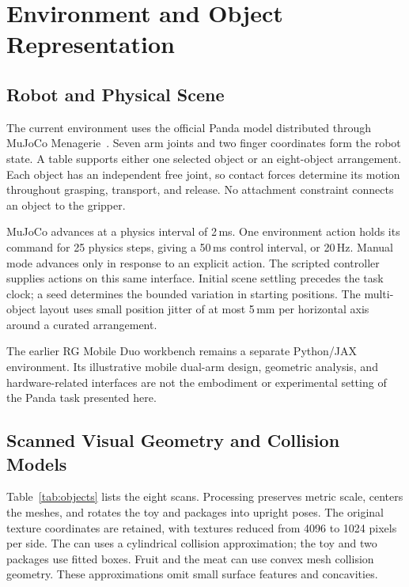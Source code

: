 \documentclass[10pt]{article}
\begin{document}
\section{Environment and Object Representation}
\subsection{Robot and Physical Scene}
The current environment uses the official Panda model distributed through MuJoCo Menagerie~\cite{menagerie}. Seven arm joints and two finger coordinates form the robot state. A table supports either one selected object or an eight-object arrangement. Each object has an independent free joint, so contact forces determine its motion throughout grasping, transport, and release. No attachment constraint connects an object to the gripper.

MuJoCo advances at a physics interval of 2\,ms. One environment action holds its command for 25 physics steps, giving a 50\,ms control interval, or 20\,Hz. Manual mode advances only in response to an explicit action. The scripted controller supplies actions on this same interface. Initial scene settling precedes the task clock; a seed determines the bounded variation in starting positions. The multi-object layout uses small position jitter of at most 5\,mm per horizontal axis around a curated arrangement.

The earlier RG Mobile Duo workbench remains a separate Python/JAX environment. Its illustrative mobile dual-arm design, geometric analysis, and hardware-related interfaces are not the embodiment or experimental setting of the Panda task presented here.

\subsection{Scanned Visual Geometry and Collision Models}
Table~\ref{tab:objects} lists the eight scans. Processing preserves metric scale, centers the meshes, and rotates the toy and packages into upright poses. The original texture coordinates are retained, with textures reduced from 4096 to 1024 pixels per side. The can uses a cylindrical collision approximation; the toy and two packages use fitted boxes. Fruit and the meat can use convex mesh collision geometry. These approximations omit small surface features and concavities.
\end{document}
